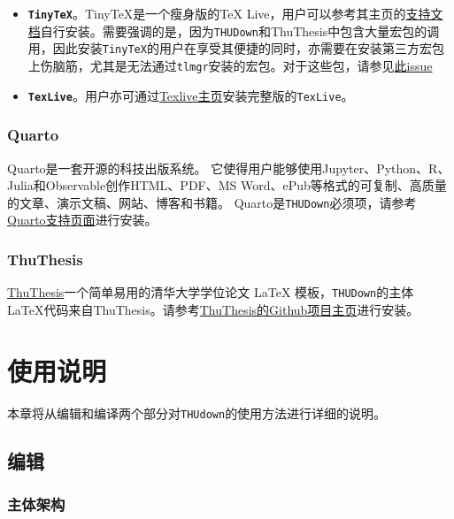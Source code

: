 \begin{itemize}
\item
  \textbf{\texttt{TinyTeX}}。TinyTeX是一个瘦身版的TeX
  Live，用户可以参考其主页的\href{https://yihui.org/tinytex/}{支持文档}自行安装。需要强调的是，因为\texttt{THUDown}和ThuThesis中包含大量宏包的调用，因此安装\texttt{TinyTeX}的用户在享受其便捷的同时，亦需要在安装第三方宏包上伤脑筋，尤其是无法通过\texttt{tlmgr}安装的宏包。对于这些包，请参见\href{https://github.com/rstudio/tinytex/issues/126\#issuecomment-503020154}{此issue}
\item
  \textbf{\texttt{TexLive}}。用户亦可通过\href{https://tug.org/texlive/}{Texlive主页}安装完整版的\texttt{TexLive}。
\end{itemize}

\hypertarget{quarto}{%
\subsection{Quarto}\label{quarto}}

Quarto是一套开源的科技出版系统。
它使得用户能够使用Jupyter、Python、R、Julia和Observable创作HTML、PDF、MS
Word、ePub等格式的可复制、高质量的文章、演示文稿、网站、博客和书籍。
Quarto是\texttt{THUDown}必须项，请参考\href{https://quarto.org/docs/get-started/}{Quarto支持页面}进行安装。

\hypertarget{thuthesis}{%
\subsection{ThuThesis}\label{thuthesis}}

\href{https://github.com/tuna/thuthesis}{ThuThesis}一个简单易用的清华大学学位论文
LaTeX 模板，\texttt{THUDown}的主体
\LaTeX 代码来自ThuThesis。请参考\href{https://github.com/tuna/thuthesis\#readme}{ThuThesis的Github项目主页}进行安装。


\hypertarget{ux4f7fux7528ux8bf4ux660e}{%
\chapter{使用说明}\label{ux4f7fux7528ux8bf4ux660e}}

本章将从编辑和编译两个部分对\texttt{THUdown}的使用方法进行详细的说明。

\hypertarget{ux7f16ux8f91}{%
\section{编辑}\label{ux7f16ux8f91}}

\hypertarget{ux4e3bux4f53ux67b6ux6784}{%
\subsection{主体架构}\label{ux4e3bux4f53ux67b6ux6784}}

